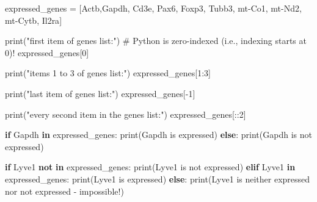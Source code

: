\documentclass[
  letterpaper,
  DIV=11,
  numbers=noendperiod]{scrartcl}
\newenvironment{Shaded}{\begin{snugshade}}{\end{snugshade}}
\newcommand{\BuiltInTok}[1]{\textcolor[rgb]{0.00,0.23,0.31}{#1}}
\newcommand{\CommentTok}[1]{\textcolor[rgb]{0.37,0.37,0.37}{#1}}
\newcommand{\ControlFlowTok}[1]{\textcolor[rgb]{0.00,0.23,0.31}{\textbf{#1}}}
\newcommand{\DecValTok}[1]{\textcolor[rgb]{0.68,0.00,0.00}{#1}}
\newcommand{\KeywordTok}[1]{\textcolor[rgb]{0.00,0.23,0.31}{\textbf{#1}}}
\newcommand{\NormalTok}[1]{\textcolor[rgb]{0.00,0.23,0.31}{#1}}
\newcommand{\OperatorTok}[1]{\textcolor[rgb]{0.37,0.37,0.37}{#1}}
\newcommand{\StringTok}[1]{\textcolor[rgb]{0.13,0.47,0.30}{#1}}
\begin{document}
\begin{Shaded}
\begin{Highlighting}[]
\NormalTok{expressed\_genes }\OperatorTok{=}\NormalTok{ [}\StringTok{\textquotesingle{}Actb\textquotesingle{}}\NormalTok{,}\StringTok{\textquotesingle{}Gapdh\textquotesingle{}}\NormalTok{, }\StringTok{\textquotesingle{}Cd3e\textquotesingle{}}\NormalTok{, }\StringTok{\textquotesingle{}Pax6\textquotesingle{}}\NormalTok{, }\StringTok{\textquotesingle{}Foxp3\textquotesingle{}}\NormalTok{, }\StringTok{\textquotesingle{}Tubb3\textquotesingle{}}\NormalTok{, }\StringTok{\textquotesingle{}mt{-}Co1\textquotesingle{}}\NormalTok{, }\StringTok{\textquotesingle{}mt{-}Nd2\textquotesingle{}}\NormalTok{, }\StringTok{\textquotesingle{}mt{-}Cytb\textquotesingle{}}\NormalTok{, }\StringTok{\textquotesingle{}Il2ra\textquotesingle{}}\NormalTok{]}

\BuiltInTok{print}\NormalTok{(}\StringTok{"first item of genes list:"}\NormalTok{) }\CommentTok{\# Python is zero{-}indexed (i.e., indexing starts at 0)!}
\NormalTok{expressed\_genes[}\DecValTok{0}\NormalTok{]}

\BuiltInTok{print}\NormalTok{(}\StringTok{"items 1 to 3 of genes list:"}\NormalTok{)}
\NormalTok{expressed\_genes[}\DecValTok{1}\NormalTok{:}\DecValTok{3}\NormalTok{]}

\BuiltInTok{print}\NormalTok{(}\StringTok{"last item of genes list:"}\NormalTok{)}
\NormalTok{expressed\_genes[}\OperatorTok{{-}}\DecValTok{1}\NormalTok{]}

\BuiltInTok{print}\NormalTok{(}\StringTok{"every second item in the genes list:"}\NormalTok{)}
\NormalTok{expressed\_genes[::}\DecValTok{2}\NormalTok{]}


\ControlFlowTok{if} \StringTok{\textquotesingle{}Gapdh\textquotesingle{}} \KeywordTok{in}\NormalTok{ expressed\_genes: }
    \BuiltInTok{print}\NormalTok{(}\StringTok{\textquotesingle{}Gapdh is expressed\textquotesingle{}}\NormalTok{)}
\ControlFlowTok{else}\NormalTok{:}
    \BuiltInTok{print}\NormalTok{(}\StringTok{\textquotesingle{}Gapdh is not expressed\textquotesingle{}}\NormalTok{)}

\ControlFlowTok{if} \StringTok{\textquotesingle{}Lyve1\textquotesingle{}} \KeywordTok{not} \KeywordTok{in}\NormalTok{ expressed\_genes: }
    \BuiltInTok{print}\NormalTok{(}\StringTok{\textquotesingle{}Lyve1 is not expressed\textquotesingle{}}\NormalTok{)}
\ControlFlowTok{elif} \StringTok{\textquotesingle{}Lyve1\textquotesingle{}} \KeywordTok{in}\NormalTok{ expressed\_genes:}
    \BuiltInTok{print}\NormalTok{(}\StringTok{\textquotesingle{}Lyve1 is expressed\textquotesingle{}}\NormalTok{)}
\ControlFlowTok{else}\NormalTok{:}
    \BuiltInTok{print}\NormalTok{(}\StringTok{\textquotesingle{}Lyve1 is neither expressed nor not expressed {-} impossible!\textquotesingle{}}\NormalTok{)}



\end{Highlighting}
\end{Shaded}
\end{document}
